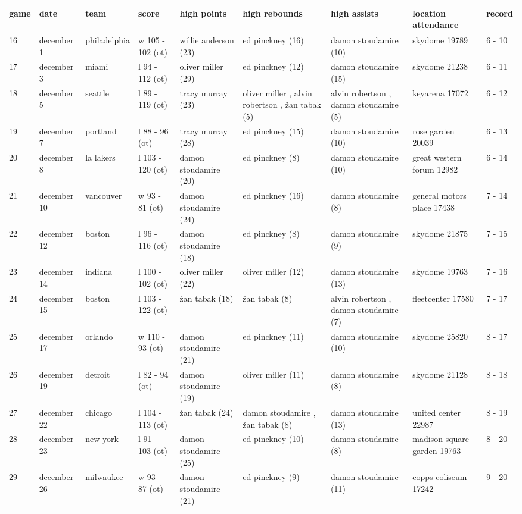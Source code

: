 \documentclass{article}
\begin{document}
\begin{tabular}{lllllllll}
\toprule
game & date & team & score & high points & high rebounds & high assists & location attendance & record \\
\midrule
16 & december 1 & philadelphia & w 105 - 102 (ot) & willie anderson (23) & ed pinckney (16) & damon stoudamire (10) & skydome 19789 & 6 - 10 \\
17 & december 3 & miami & l 94 - 112 (ot) & oliver miller (29) & ed pinckney (12) & damon stoudamire (15) & skydome 21238 & 6 - 11 \\
18 & december 5 & seattle & l 89 - 119 (ot) & tracy murray (23) & oliver miller , alvin robertson , žan tabak (5) & alvin robertson , damon stoudamire (5) & keyarena 17072 & 6 - 12 \\
19 & december 7 & portland & l 88 - 96 (ot) & tracy murray (28) & ed pinckney (15) & damon stoudamire (10) & rose garden 20039 & 6 - 13 \\
20 & december 8 & la lakers & l 103 - 120 (ot) & damon stoudamire (20) & ed pinckney (8) & damon stoudamire (10) & great western forum 12982 & 6 - 14 \\
21 & december 10 & vancouver & w 93 - 81 (ot) & damon stoudamire (24) & ed pinckney (16) & damon stoudamire (8) & general motors place 17438 & 7 - 14 \\
22 & december 12 & boston & l 96 - 116 (ot) & damon stoudamire (18) & ed pinckney (8) & damon stoudamire (9) & skydome 21875 & 7 - 15 \\
23 & december 14 & indiana & l 100 - 102 (ot) & oliver miller (22) & oliver miller (12) & damon stoudamire (13) & skydome 19763 & 7 - 16 \\
24 & december 15 & boston & l 103 - 122 (ot) & žan tabak (18) & žan tabak (8) & alvin robertson , damon stoudamire (7) & fleetcenter 17580 & 7 - 17 \\
25 & december 17 & orlando & w 110 - 93 (ot) & damon stoudamire (21) & ed pinckney (11) & damon stoudamire (10) & skydome 25820 & 8 - 17 \\
26 & december 19 & detroit & l 82 - 94 (ot) & damon stoudamire (19) & oliver miller (11) & damon stoudamire (8) & skydome 21128 & 8 - 18 \\
27 & december 22 & chicago & l 104 - 113 (ot) & žan tabak (24) & damon stoudamire , žan tabak (8) & damon stoudamire (13) & united center 22987 & 8 - 19 \\
28 & december 23 & new york & l 91 - 103 (ot) & damon stoudamire (25) & ed pinckney (10) & damon stoudamire (8) & madison square garden 19763 & 8 - 20 \\
29 & december 26 & milwaukee & w 93 - 87 (ot) & damon stoudamire (21) & ed pinckney (9) & damon stoudamire (11) & copps coliseum 17242 & 9 - 20 \\
\bottomrule
\end{tabular}
\end{document}
